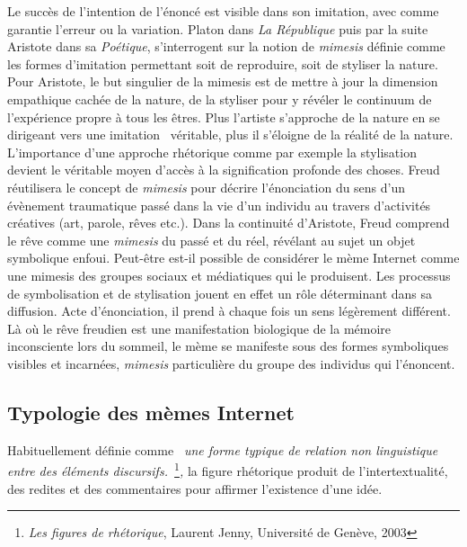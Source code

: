 Le succès de l{\textquoteright}intention de l{\textquoteright}énoncé est visible dans son imitation, avec comme garantie l{\textquoteright}erreur ou la variation. Platon dans \textit{La République} puis par la suite Aristote dans sa \textit{Poétique}, s{\textquoteright}interrogent sur la notion de \textit{mimesis} définie comme les formes d{\textquoteright}imitation permettant soit de reproduire, soit de styliser la nature. Pour Aristote, le but singulier de la mimesis est de mettre à jour la dimension empathique cachée de la nature, de la styliser pour y révéler le continuum de l{\textquoteright}expérience propre à tous les êtres. Plus l{\textquoteright}artiste s{\textquoteright}approche de la nature en se dirigeant vers une imitation {\guillemotleft}~véritable{\guillemotright}, plus il s{\textquoteright}éloigne de la réalité de la nature. L{\textquoteright}importance d{\textquoteright}une approche rhétorique comme par exemple la stylisation devient le véritable moyen d{\textquoteright}accès à la signification profonde des choses. Freud réutilisera le concept de \textit{mimesis} pour décrire l{\textquoteright}énonciation du sens d{\textquoteright}un évènement traumatique passé dans la vie d{\textquoteright}un individu au travers d{\textquoteright}activités créatives (art, parole, rêves etc.). Dans la continuité d{\textquoteright}Aristote, Freud comprend le rêve comme une \textit{mimesis} du passé et du réel, révélant au sujet un objet symbolique enfoui. Peut-être est-il possible de considérer le mème Internet comme une mimesis des groupes sociaux et médiatiques qui le produisent. Les processus de symbolisation et de stylisation jouent en effet un rôle déterminant dans sa diffusion. Acte d{\textquoteright}énonciation, il prend à chaque fois un sens légèrement différent. Là où le rêve freudien est une manifestation biologique de la mémoire inconsciente lors du  sommeil, le mème se manifeste sous des formes symboliques visibles et incarnées, \textit{mimesis} particulière du groupe des individus qui l{\textquoteright}énoncent. 


\subsection[Typologie des mèmes Internet]{Typologie des mèmes Internet}

Habituellement définie comme \textit{{\guillemotleft}~une forme typique de relation non linguistique entre des éléments discursifs.~{\guillemotright}}\footnote{ \textit{Les figures de rhétorique}, Laurent Jenny, Université de Genève, 2003}\textit{, }la figure rhétorique produit de l{\textquoteright}intertextualité, des redites et des commentaires pour affirmer l{\textquoteright}existence d{\textquoteright}une idée.

